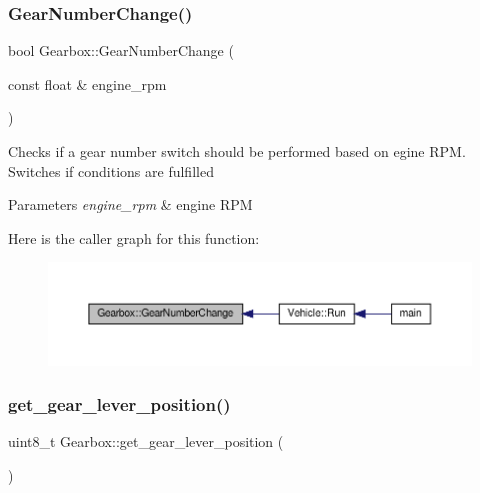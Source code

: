 \subsubsection{\texorpdfstring{Gear\+Number\+Change()}{GearNumberChange()}}
{\footnotesize\ttfamily bool Gearbox\+::\+Gear\+Number\+Change (\begin{DoxyParamCaption}\item[{const float \&}]{engine\+\_\+rpm }\end{DoxyParamCaption})}

Checks if a gear number switch should be performed based on egine R\+PM. Switches if conditions are fulfilled 
\begin{DoxyParams}{Parameters}
{\em engine\+\_\+rpm} & engine R\+PM \\
\hline
\end{DoxyParams}
Here is the caller graph for this function\+:
\nopagebreak
\begin{figure}[H]
\begin{center}
\leavevmode
\includegraphics[width=350pt]{classGearbox_a7204cb43a9a923283b7d8994e8d1317d_icgraph}
\end{center}
\end{figure}
\mbox{\label{classGearbox_a6e3e4eefa42a5811396aee1fad572adc}} 
\subsubsection{\texorpdfstring{get\+\_\+gear\+\_\+lever\+\_\+position()}{get\_gear\_lever\_position()}}
{\footnotesize\ttfamily uint8\+\_\+t Gearbox\+::get\+\_\+gear\+\_\+lever\+\_\+position (\begin{DoxyParamCaption}{ }\end{DoxyParamCaption})}

